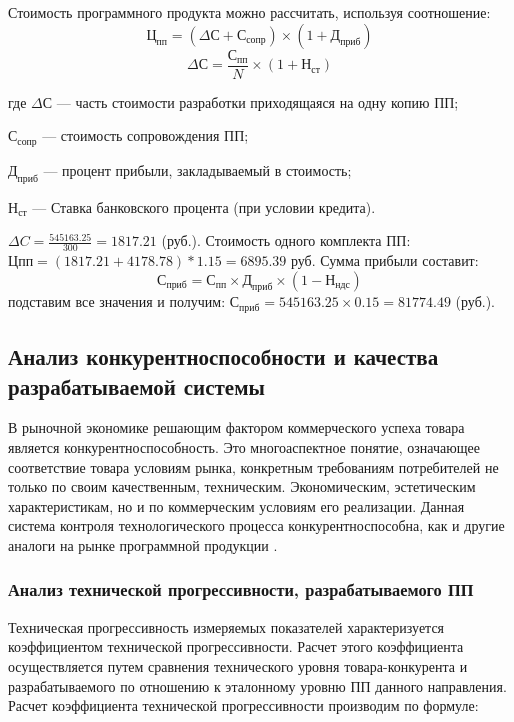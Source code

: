 Стоимость программного продукта можно рассчитать, используя соотношение:
\begin{equation}Ц_{пп} = (\Delta{}С + С_{сопр}) \times{} (1 + Д_{приб})\end{equation}
\begin{equation}\Delta{}С = \frac{С_{пп}}{N} \times{} (1 + Н_{ст})\end{equation}

\begin{ESKDexplanation}                       
	\item[где ] $\Delta{}С$ --- часть стоимости разработки приходящаяся на одну копию ПП;
	\item{} $С_{сопр}$ --- стоимость сопровождения ПП;
	\item{} $Д_{приб}$ --- процент прибыли, закладываемый в стоимость;
	\item{} $Н_{ст}$ --- Ставка банковского процента (при условии кредита).
\end{ESKDexplanation}

$\Delta{} C = \frac{545163.25}{300} = 1817.21$ (руб.).
Стоимость одного комплекта ПП: $Цпп = (1817.21 +4178.78)*1.15  =  6895.39$ руб.
Сумма прибыли составит:
\begin{equation}С_{приб} = С_{пп} \times{} Д_{приб} \times{} (1 - Н_{ндс})\end{equation}
подставим все значения и получим: $С_{приб} = 545163.25 \times{} 0.15 =  81774.49$ (руб.).


\subsection{Анализ конкурентноспособности и качества   разрабатываемой системы}
В рыночной экономике решающим фактором коммерческого успеха товара является конкурентноспособность.
Это многоаспектное понятие, означающее соответствие товара условиям рынка, конкретным
требованиям потребителей не только по своим качественным, техническим.
Экономическим, эстетическим характеристикам, но и по коммерческим условиям его реализации.
Данная система контроля технологического процесса конкурентноспособна, как и другие аналоги
на рынке программной продукции \cite{econ}.

\subsubsection{Анализ технической  прогрессивности, разрабатываемого ПП}
Техническая прогрессивность  измеряемых показателей  характеризуется
коэффициентом технической прогрессивности. Расчет этого коэффициента 
осуществляется путем сравнения  технического уровня  товара-конкурента
и разрабатываемого по отношению к эталонному уровню  ПП  данного направления.
Расчет коэффициента технической прогрессивности производим по формуле:

